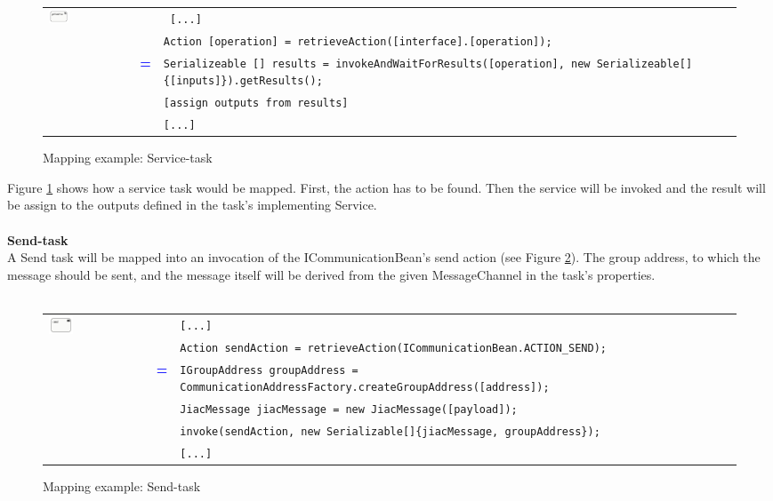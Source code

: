 \begin{figure}[h]
\begin{tabularx}{\linewidth}{lcX}
	\multirow{5}{*}{\includegraphics[width=0.25\textwidth]{images/mapping/service_task.png}} & & \texttt{ [...]}\\
	& & \texttt{Action [operation] = retrieveAction([interface].[operation]);}\\
	& \textbf{\textcolor{blue}{=}} & \texttt{Serializeable [] results = invokeAndWaitForResults([operation], new Serializeable[]\{[inputs]\}).getResults();}\\
  & & \texttt{[assign outputs from results]}\\
  & & \texttt{[...]}
\end{tabularx}
\caption{Mapping example: Service-task}%
\label{fig:service_task}%
\end{figure}
Figure \ref{fig:service_task} shows how a service task would be mapped. First, the action has to be found. Then the service will be invoked and the result will be assign to the outputs defined in the task's implementing Service.\\\\

\textbf{Send-task}\\
A Send task will be mapped into an invocation of the ICommunicationBean's send action (see Figure \ref{fig:send_task}). The group address, to which the message should be sent, and the message itself will be derived from the given MessageChannel in the task's properties. \\\\
 
\begin{figure}[h]
\begin{tabularx}{\linewidth}{lcX}
	\multirow{6}{*}{\includegraphics[width=0.25\textwidth]{images/mapping/sendTask.png}} & & \texttt{[...]}\\
	& & \texttt{Action sendAction = retrieveAction(ICommunicationBean.ACTION\_SEND);}\\
	& \textbf{\textcolor{blue}{=}} & \texttt{IGroupAddress groupAddress = CommunicationAddressFactory.createGroupAddress([address]);}\\
	& & \texttt{JiacMessage jiacMessage = new JiacMessage([payload]);}\\
	& & \texttt{invoke(sendAction, new Serializable[]\{jiacMessage, groupAddress\});}\\
 & & \texttt{[...]}
\end{tabularx}
\caption{Mapping example: Send-task}%
\label{fig:send_task}%
\end{figure}



